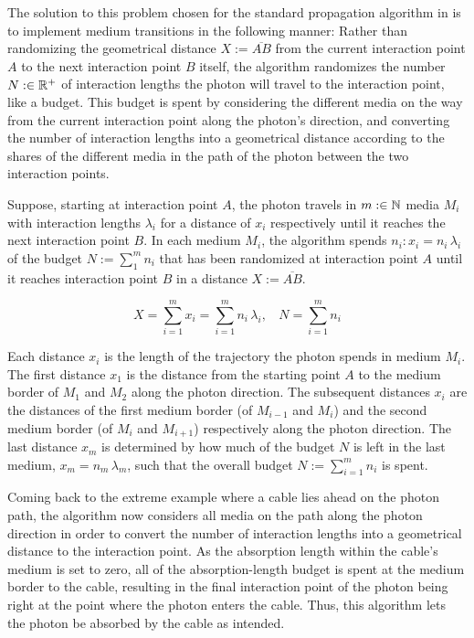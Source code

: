 The solution to this problem chosen for the standard propagation
algorithm in \icecube is to implement medium transitions in the
following manner: Rather than randomizing the geometrical distance
\(X:=\overline{AB}\) from the current interaction point \(A\) to the
next interaction point \(B\) itself, the algorithm randomizes the number
\(N :\in \mathbb{R}^+\) of interaction lengths the photon will travel to the
interaction point, like a budget. This budget is spent by considering
the different media on the way from the current interaction point along
the photon's direction, and converting the number of interaction lengths
into a geometrical distance according to the shares of the different
media in the path of the photon between the two interaction points.

Suppose, starting at interaction point \(A\), the photon travels in
\(m :\in \mathbb{N}\) media \(M_i\) with interaction lengths
\(\lambda_i\) for a distance of \(x_i\) respectively until it reaches
the next interaction point \(B\). In each medium \(M_i\), the algorithm
spends \(n_i: x_i = n_i\,\lambda_i\) of the budget \(N:=\sum_1^m n_i\)
that has been randomized at interaction point \(A\) until it reaches
interaction point \(B\) in a distance \(X:=\overline{AB}\).

\begin{equation}
  X = \sum_{i=1}^m x_i = \sum_{i=1}^m n_i\,\lambda_i, \ \ \ \ N = \sum_{i=1}^m n_i
  \label{eq:convertbudgettodistance}
\end{equation}

Each distance \(x_i\) is the length of the trajectory the photon spends
in medium \(M_i\). The first distance \(x_1\) is the distance from the
starting point \(A\) to the medium border of \(M_1\) and \(M_2\) along
the photon direction. The subsequent distances \(x_i\) are the distances
of the first medium border (of \(M_{i-1}\) and \(M_i\)) and the second
medium border (of \(M_i\) and \(M_{i+1}\)) respectively along the photon
direction. The last distance \(x_m\) is determined by how much of the
budget \(N\) is left in the last medium, \(x_m = n_m\,\lambda_m\), such
that the overall budget \(N:=\sum_{i=1}^m n_i\) is spent.

Coming back to the extreme example where a cable lies ahead on the
photon path, the algorithm now considers all media on the path along the
photon direction in order to convert the number of interaction lengths
into a geometrical distance to the interaction point. As the absorption
length within the cable's medium is set to zero, all of the
absorption-length budget is spent at the medium border to the cable,
resulting in the final interaction point of the photon being right at
the point where the photon enters the cable. Thus, this algorithm lets
the photon be absorbed by the cable as intended.

